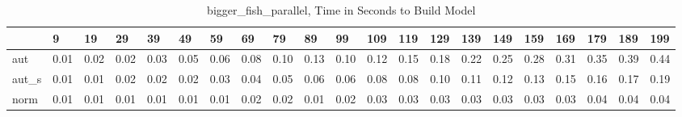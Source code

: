\begin{table}
\centering
\caption{bigger_fish_parallel, Time in Seconds to Build Model}
\label{bigger_fish_parallel_model_time}
\begin{tabular}{lllllllllllllllllllll}
\toprule
{} &     9 &    19 &    29 &    39 &    49 &    59 &    69 &    79 &    89 &    99 &   109 &   119 &   129 &   139 &   149 &   159 &   169 &   179 &   189 &   199 \\
\midrule
aut   &  0.01 &  0.02 &  0.02 &  0.03 &  0.05 &  0.06 &  0.08 &  0.10 &  0.13 &  0.10 &  0.12 &  0.15 &  0.18 &  0.22 &  0.25 &  0.28 &  0.31 &  0.35 &  0.39 &  0.44 \\
aut\_s &  0.01 &  0.01 &  0.02 &  0.02 &  0.02 &  0.03 &  0.04 &  0.05 &  0.06 &  0.06 &  0.08 &  0.08 &  0.10 &  0.11 &  0.12 &  0.13 &  0.15 &  0.16 &  0.17 &  0.19 \\
norm  &  0.01 &  0.01 &  0.01 &  0.01 &  0.01 &  0.01 &  0.02 &  0.02 &  0.01 &  0.02 &  0.03 &  0.03 &  0.03 &  0.03 &  0.03 &  0.03 &  0.03 &  0.04 &  0.04 &  0.04 \\
\bottomrule
\end{tabular}
\end{table}
